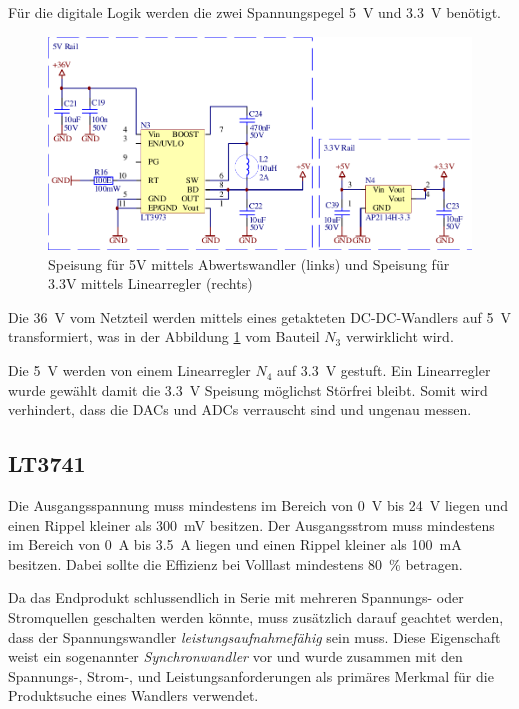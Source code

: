 F\"ur die digitale  Logik  werden  die  zwei  Spannungspegel  \SI{5}{\volt}  und
\SI{3.3}{\volt} ben\"otigt. 

\begin{figure}[th!]
    \center
    \includegraphics[width=.75\textwidth]{images/circuit/5v-3v-rails.pdf}
    \caption{Speisung f\"ur 5V mittels Abwertswandler (links) und Speisung f\"ur 3.3V mittels Linearregler (rechts)}
    \label{fig:circuit:rails}
\end{figure}

Die  \SI{36}{\volt} vom Netzteil werden mittels eines getakteten  DC-DC-Wandlers
auf \SI{5}{\volt} transformiert,  was  in  der Abbildung \ref{fig:circuit:rails}
vom Bauteil $N_3$ verwirklicht wird.

Die  \SI{5}{\volt}  werden  von  einem  Linearregler $N_4$  auf  \SI{3.3}{\volt}
gestuft.  Ein  Linearregler  wurde  gew\"ahlt damit die \SI{3.3}{\volt} Speisung
m\"oglichst St\"orfrei bleibt.  Somit  wird  verhindert,  dass die DACs und ADCs
verrauscht sind und ungenau messen.

\subsection{LT3741}

Die  Ausgangsspannung   muss   mindestens   im  Bereich  von  \SI{0}{\volt}  bis
\SI{24}{\volt}  liegen  und   einen  Rippel  kleiner  als  \SI{300}{\milli\volt}
besitzen.  Der  Ausgangsstrom muss mindestens im Bereich von \SI{0}{\ampere} bis
\SI{3.5}{\ampere} liegen  und  einen  Rippel kleiner als \SI{100}{\milli\ampere}
besitzen. Dabei  sollte  die Effizienz bei Volllast mindestens \SI{80}{\percent}
betragen.

Da  das  Endprodukt  schlussendlich  in  Serie  mit  mehreren   Spannungs-  oder
Stromquellen  geschalten  werden  k\"onnte, muss  zus\"atzlich  darauf  geachtet
werden,  dass  der Spannungswandler \emph{leistungsaufnahmef\"ahig}  sein  muss.
Diese Eigenschaft weist  ein  sogenannter  \emph{Synchronwandler}  vor und wurde
zusammen mit den Spannungs-,  Strom-,  und Leistungsanforderungen als prim\"ares
Merkmal f\"ur die Produktsuche eines Wandlers verwendet.

